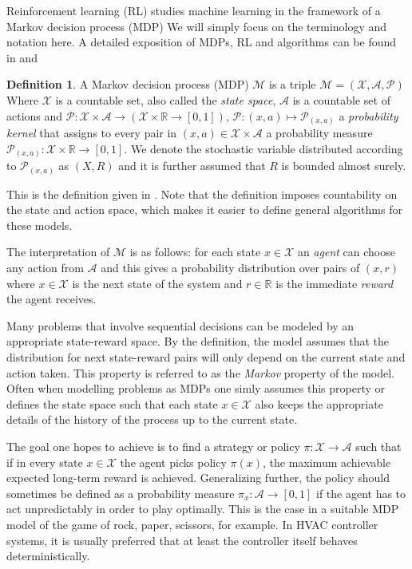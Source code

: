 \documentclass{article}
\theoremstyle{definition}
\newtheorem{definition}[theorem]{Definition}
\theoremstyle{remark}
\newcommand{\mar}{\mathcal{M}}
\newcommand{\stat}{\mathcal{X}}
\newcommand{\act}{\mathcal{A}}
\newcommand{\prob}{\mathcal{P}}
\newcommand{\R}{\mathbb{R}}
\begin{document}
Reinforcement learning (RL) studies machine learning in the framework of a Markov decision process (MDP)
We will simply focus on the terminology and notation here. A detailed exposition of MDPs, RL and 
algorithms can be found in \cite{suttonbarto2018} and \cite{Szepesvari2010}

\begin{definition} A Markov decision process (MDP)  $\mar$ is a triple $\mar = (\stat, \act, \prob)$
Where $\stat$ is a countable set, also called the \emph{state space}, $\act$ is a countable set of actions and $\prob: \stat \times \act \rightarrow (\stat \times \R \rightarrow [0,1])$, $\prob: (x,a) \mapsto \prob_{(x,a)}$ a \emph{probability kernel} that assigns to every pair in $(x,a) \in \stat \times \act$ a probability measure $\prob_{(x,a)}:\stat \times \R \rightarrow [0,1]$. We denote the stochastic variable distributed according to $\prob_{(x,a)}$ as $(X,R)$ and it is further assumed that $R$ is bounded almost surely.
\end{definition}
This is the definition given in \cite{Szepesvari2010}.
Note that the definition imposes countability on the state and action space, which makes it
easier to define general algorithms for these models.

The interpretation of $\mar$ is as follows: for each state $x\in\stat$ an \emph{agent} can choose any
action from $\act$ and this gives a probability distribution over pairs of $(x,r)$ where $x\in\stat$ 
is the next state of the system and
$r\in \R$ is the immediate \emph{reward} the agent receives. 

Many problems that involve sequential 
decisions can be modeled by an appropriate state-reward space. By the definition, the model
assumes that the distribution for next state-reward pairs will only depend on the current state and
action taken. This property is referred to as the \emph{Markov} property of the model. Often when modelling
problems as MDPs one simly assumes this property or defines the state space such that each
state $x\in \stat$ also keeps the appropriate details of the history of the process up to the current state.

The goal one hopes to achieve is to find a strategy or policy $\pi : \stat \rightarrow \act$ such that if in
every state $x\in\stat$ the agent picks policy $\pi(x)$, the maximum achievable expected long-term reward is achieved. Generalizing further, the policy should sometimes be defined as a probability measure $\pi_x:\act \rightarrow [0,1]$ if the agent has to act unpredictably in order to play optimally. This is the case in a suitable
MDP model of the
game of rock, paper, scissors, for example. In HVAC controller systems, it is usually preferred that at least the controller itself behaves deterministically.
\end{document}
